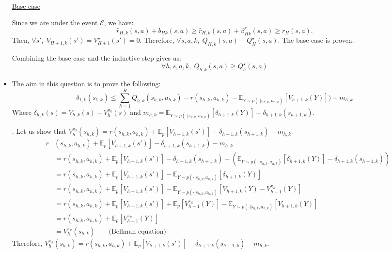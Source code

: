 \documentclass[a4paper]{article}
\newcommand{\wh}[1]{\widehat{#1}}
\begin{document}
\begin{itemize}
	
	\subitem \underline{Base case}
	
	Since we are under the event $\mathcal{E}$, we have:
	\begin{equation*}
		\wh r_{H,k}(s,a)+ b_{Hk}(s,a) \geq \wh r_{H,k}(s,a)+\beta^r_{Hk}(s,a) \geq r_{H}(s,a).
	\end{equation*}
	Then, $\forall s',\; V_{H+1, k}(s') = V^\star_{H+1}(s') = 0$. Therefore, $\forall s,a,k, \; Q_{H,k}(s,a) - Q^\star_H(s,a)$. The base case is proven.
	
	Combining the base case and the inductive step gives us:
	\[
	\boxed{\forall h,s,a,k,\; Q_{h,k}(s,a) \geq Q^\star_h(s,a)}
	\]
	
	
	\item The aim in this question is to prove the following:
	\begin{equation}
	\label{eq:1}
	\delta_{1,k}(s_{1,k}) \leq \sum_{h=1}^H Q_{h,k}(s_{h,k},a_{h,k}) - r(s_{h,k},a_{h,k}) - \mathbb{E}_{Y\sim p(\cdot|s_{h,k},a_{h,k})}[V_{h+1,k}(Y)]) + m_{h,k}
	\end{equation}
	Where $\delta_{h,k}(s) = V_{h,k}(s) - V_h^{\pi_k}(s)$ and $m_{h,k} = \mathbb{E}_{Y\sim p(\cdot|s_{h,k},a_{h,k})}[\delta_{h+1,k}(Y)] - \delta_{h+1,k}(s_{h+1,k})$.
	
	. Let us show that $V^{\pi_{k}}_h(s_{h,k}) = r(s_{h,k},a_{h,k}) + \mathbb{E}_{p}[V_{h+1,k}(s')] - \delta_{h+1,k}(s_{h+1,k}) - m_{h,k}$.
	\begin{align*}
		\quad r&(s_{h,k},a_{h,k}) + \mathbb{E}_{p}[V_{h+1,k}(s')] - \delta_{h+1,k}(s_{h+1,k}) - m_{h,k} \\
		&= r(s_{h,k},a_{h,k}) + \mathbb{E}_{p}[V_{h+1,k}(s')] - \delta_{h+1,k}(s_{h+1,k}) - \left( \mathbb{E}_{Y\sim p(\cdot|s_{h,k},a_{h,k})}[\delta_{h+1,k}(Y)] - \delta_{h+1,k}(s_{h+1,k}) \right) \\
		&= r(s_{h,k},a_{h,k}) + \mathbb{E}_{p}[V_{h+1,k}(s')] - \mathbb{E}_{Y\sim p(\cdot|s_{h,k},a_{h,k})}[\delta_{h+1,k}(Y)] \\
		&= r(s_{h,k},a_{h,k}) + \mathbb{E}_{p}[V_{h+1,k}(s')] - \mathbb{E}_{Y\sim p(\cdot|s_{h,k},a_{h,k})}[V_{h+1,k}(Y) - V_{h+1}^{\pi_k}(Y)] \\
		&= r(s_{h,k},a_{h,k}) + \mathbb{E}_{p}[V_{h+1,k}(s')] + \mathbb{E}_{p}[V_{h+1}^{\pi_k}(Y)] - \mathbb{E}_{Y\sim p(\cdot|s_{h,k},a_{h,k})}[V_{h+1,k}(Y)] \\
		&= r(s_{h,k},a_{h,k}) + \mathbb{E}_{p}[V_{h+1}^{\pi_k}(Y)] \\
		&= V^{\pi_{k}}_h(s_{h,k}) \qquad \text{(Bellman equation)}
	\end{align*}
	\qquad \qquad Therefore, $\boxed{V^{\pi_{k}}_h(s_{h,k}) = r(s_{h,k},a_{h,k}) + \mathbb{E}_{p}[V_{h+1,k}(s')] - \delta_{h+1,k}(s_{h+1,k}) - m_{h,k}}$.
		

\end{itemize}
\end{document}
